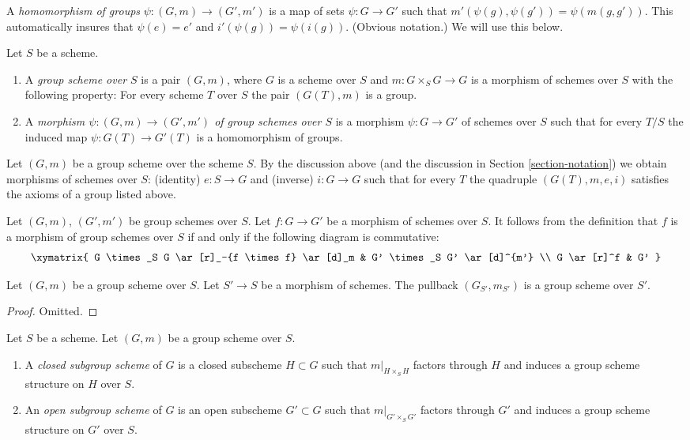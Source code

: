 \medskip\noindent
A {\it homomorphism of groups} $\psi : (G, m) \to (G', m')$
is a map of sets $\psi : G \to G'$ such that
$m'(\psi(g), \psi(g')) = \psi(m(g, g'))$. This automatically
insures that $\psi(e) = e'$ and $i'(\psi(g)) = \psi(i(g))$.
(Obvious notation.) We will use this below.

\begin{definition}
\label{definition-group-scheme}
Let $S$ be a scheme.
\begin{enumerate}
\item A {\it group scheme over $S$} is a pair $(G, m)$, where
$G$ is a scheme over $S$ and $m : G \times_S G \to G$ is
a morphism of schemes over $S$ with the following property:
For every scheme $T$ over $S$ the pair $(G(T), m)$
is a group.
\item A {\it morphism $\psi : (G, m) \to (G', m')$ of group schemes over $S$}
is a morphism $\psi : G \to G'$ of schemes over $S$ such that for
every $T/S$ the induced map $\psi : G(T) \to G'(T)$ is a homomorphism
of groups.
\end{enumerate}
\end{definition}

\noindent
Let $(G, m)$ be a group scheme over the scheme $S$.
By the discussion above (and the discussion in Section \ref{section-notation})
we obtain morphisms of schemes over $S$:
(identity) $e : S \to G$ and (inverse) $i : G \to G$ such that
for every $T$ the quadruple $(G(T), m, e, i)$ satisfies the
axioms of a group listed above.

\medskip\noindent
Let $(G, m)$, $(G', m')$ be group schemes over $S$.
Let $f : G \to G'$ be a morphism of schemes over $S$.
It follows from the definition that $f$ is a morphism
of group schemes over $S$ if and only if the following diagram
is commutative:
$$
\xymatrix{
G \times_S G \ar[r]_-{f \times f} \ar[d]_m &
G' \times_S G' \ar[d]^{m'} \\
G \ar[r]^f & G'
}
$$

\begin{lemma}
\label{lemma-base-change-group-scheme}
Let $(G, m)$ be a group scheme over $S$.
Let $S' \to S$ be a morphism of schemes.
The pullback $(G_{S'}, m_{S'})$ is a group scheme over $S'$.
\end{lemma}

\begin{proof}
Omitted.
\end{proof}

\begin{definition}
\label{definition-closed-subgroup-scheme}
Let $S$ be a scheme. Let $(G, m)$ be a group scheme over $S$.
\begin{enumerate}
\item A {\it closed subgroup scheme} of $G$ is a closed subscheme
$H \subset G$ such that $m|_{H \times_S H}$ factors through $H$ and induces a
group scheme structure on $H$ over $S$.
\item An {\it open subgroup scheme} of $G$ is an open subscheme
$G' \subset G$ such that $m|_{G' \times_S G'}$ factors through $G'$
and induces a group scheme structure on $G'$ over $S$.
\end{enumerate}
\end{definition}

